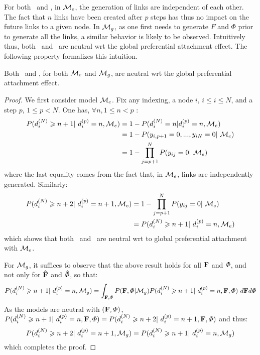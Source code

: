 For both \ifm\ and \imb, in $\mathcal{M}_e$, the generation of links are independent of each other. The fact that $n$ links have been created after $p$ steps has thus no impact on the future links to a given node. In $\mathcal{M}_g$, as one first needs to generate $F$ and $\Phi$ prior to generate all the links, a similar behavior is likely to be observed. Intuitively thus, both \ifm\ and \imb\ are neutral wrt the global preferential attachment effect. The following property formalizes this intuition.
%
\begin{proposition} \label{th:mg_glob}
Both \ifm\ and \imb, for both $\mathcal{M}_e$ and $\mathcal{M}_g$, are neutral wrt the global preferential attachment effect.
\end{proposition}
%
\begin{proof}
We first consider model $\mathcal{M}_e$. Fix any indexing, a node $i$, $i \leq i \leq N$, and a step $p$, $1 \leq p < N$. One has, $\forall n, 1 \leq n < p$ :
%
\begin{align*}
P(d_i^{(N)} \geq n+1 | d_i^{(p)}=n, \M_e) &= 1 - P(d_i^{(N)}=n | d_i^{(p)}=n, \M_e) \\
        &= 1 -P(y_{i,p+1}=0, ...,y_{iN}=0 | \M_e ) \\
        &= 1 - \prod_{j=p+1}^N P(y_{ij}=0 | \M_e)
\end{align*}
%
where the last equality comes from the fact that, in $\mathcal{M}_e$, links are independently generated. Similarly:
%
\begin{align*}
P(d_i^{(N)} \geq n+2 | d_i^{(p)}=n+1, \M_e) &= 1 - \prod_{j=p+1}^N P(y_{ij}=0 | \M_e) \\
                    &=P(d_i^{(N)} \geq n+1 | d_i^{(p)}=n, \M_e)
\end{align*}
%
which shows that both \ifm\ and \imb\ are neutral wrt to global preferential attachment with $\mathcal{M}_e$.

For $\mathcal{M}_g$, it suffices to observe that the above result holds for all $\mathbf{F}$ and $\mat{\Phi}$, and not only for $\mathbf{\hat{F}}$ and $\mat{\hat{\Phi}}$, so that:
%
\begin{equation*}
P(d_i^{(N)} \geq n+1 | d_i^{(p)}=n, \M_g)  = \int_{\mat{F},\mat{\Phi}} P(\mat{F},\mat{\Phi}|\M_g) P(d_i^{(N)} \geq n+1 | d_i^{(p)}=n, \mat{F},\mat{\Phi}) \ d\mat{F} d\mat{\Phi}
\end{equation*}
%
As the models are neutral with $(\mat{F},\mat{\Phi})$, $P(d_i^{(N)} \geq n+1 | d_i^{(p)}=n, \mat{F},\mat{\Phi}) = P(d_i^{(N)} \geq n+2 | d_i^{(p)}=n+1, \mat{F},\mat{\Phi})$ and thus:
%
\begin{equation*}
P(d_i^{(N)} \geq n+2 | d_i^{(p)}=n+1, \M_g) = P(d_i^{(N)} \geq n+1 | d_i^{(p)}=n, \M_g)
\end{equation*}
%
which completes the proof.
\end{proof}

